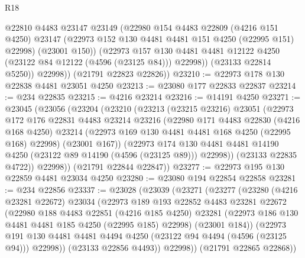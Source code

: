 \begin{lexlean}{R18}
\begin{coremodule}
              @22810
              @4483
              @23147
              @23149
              (@22980
                @154
                @4483
                @22809
                (@4216 @151 @4250)
                @23147
                (@22973 @152 @130 @4481 @4481 @151 @4250 (@22995 @151) @22998)
                (@23001 @150))
              (@22973
                @157
                @130
                @4481
                @4481
                @12122
                @4250
                (@23122 @84 @12122 (@4596 (@23125 @84)))
                @22998))
            (@23133 @22814 @5250))
          @22998))
      (@21791 @22823 @22826))
@23210 := @22973 @178 @130 @22838 @4481 @23051 @4250
@23213 := @23080 @177 @22833 @22837
@23214 := @234 @22835
@23215 := @4216 @23214
@23216 := @14191 @4250
@23271 := @23045
    (@23056
      (@23204
        (@23210
          (@23213
            (@23215 @23216)
            @23051
            (@22973
              @172
              @176
              @22831
              @4483
              @23214
              @23216
              (@22980
                @171
                @4483
                @22830
                (@4216 @168 @4250)
                @23214
                (@22973 @169 @130 @4481 @4481 @168 @4250 (@22995 @168) @22998)
                (@23001 @167))
              (@22973
                @174
                @130
                @4481
                @4481
                @14190
                @4250
                (@23122 @89 @14190 (@4596 (@23125 @89)))
                @22998))
            (@23133 @22835 @4722))
          @22998))
      (@21791 @22844 @22847))
@23277 := @22973 @195 @130 @22859 @4481 @23034 @4250
@23280 := @23080 @194 @22854 @22858
@23281 := @234 @22856
@23337 := @23028
    (@23039
      (@23271
        (@23277
          (@23280
            (@4216 @23281 @22672)
            @23034
            (@22973
              @189
              @193
              @22852
              @4483
              @23281
              @22672
              (@22980
                @188
                @4483
                @22851
                (@4216 @185 @4250)
                @23281
                (@22973 @186 @130 @4481 @4481 @185 @4250 (@22995 @185) @22998)
                (@23001 @184))
              (@22973
                @191
                @130
                @4481
                @4481
                @4494
                @4250
                (@23122 @94 @4494 (@4596 (@23125 @94)))
                @22998))
            (@23133 @22856 @4493))
          @22998))
      (@21791 @22865 @22868))

\end{coremodule}
\end{lexlean}

